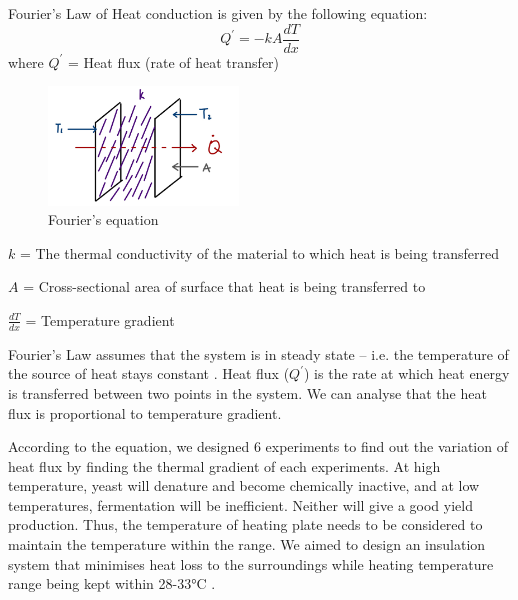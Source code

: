Fourier’s Law of Heat conduction is given by the following equation:
\begin{equation}\label{eq:HeatFlux}
    Q^{'} = -kA\frac{dT}{dx}
\end{equation}
where
$Q^{'}$ = Heat flux (rate of heat transfer)

\begin{figure}
    \begin{center}
        \includegraphics[width=0.45\textwidth]{Fourier.png}
    \end{center}
    \caption{Fourier's equation}
\end{figure}

$k$ = The thermal conductivity of the material to which heat is being transferred 

$A$ = Cross-sectional area of surface that heat is being transferred to

$\frac{dT}{dx}$ = Temperature gradient

Fourier’s Law assumes that the system is in steady state -- i.e. the temperature of the source of heat stays constant \cite{DaianJeanFrancois2014}. Heat flux ($Q^{'}$) is the rate at which heat energy is transferred between two points in the system. We can analyse that the heat flux is proportional to temperature gradient.

According to the equation, we designed 6 experiments to find out the variation of heat flux by finding the thermal gradient of each experiments. At high temperature, yeast will denature and become chemically inactive, and at low temperatures, fermentation will be inefficient. Neither will give a good yield production. Thus, the temperature of heating plate needs to be considered to maintain the temperature within the range. We aimed to design an insulation system that minimises heat loss to the surroundings while heating temperature range being kept within 28-33\si{\celsius} \cite{LIU20191}.  